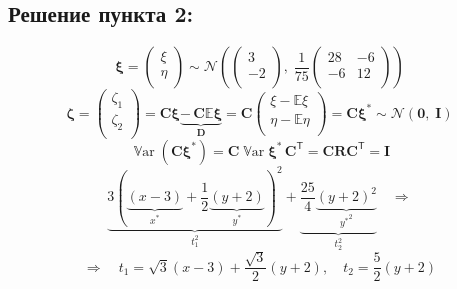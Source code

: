 \documentclass[12pt]{spbstu-task}
\begin{document}
\subsection*{Решение пункта 2:}
\begin{displaymath}
  \boldsymbol{\xi} = \begin{pmatrix}
    \xi \\
    \eta \\
  \end{pmatrix} \sim
  \mathcal{N}\left(\begin{pmatrix}
    3 \\
    -2 \\
  \end{pmatrix},\;\frac{1}{75}\begin{pmatrix}
    28 & -6 \\
    -6 & 12 \\
  \end{pmatrix}\right)
\end{displaymath}
\begin{displaymath}
  \boldsymbol{\zeta} = \begin{pmatrix}
    \zeta_1 \\
    \zeta_2 \\
  \end{pmatrix} = \mathbf{C}\boldsymbol{\xi}\underbrace{-\,\mathbf{C}\mathbb{E}\boldsymbol{\xi}}_{\mathbf{D}} = \mathbf{C}\begin{pmatrix}
    \xi - \mathbb{E}\xi \\
    \eta - \mathbb{E}\eta \\
  \end{pmatrix} = \mathbf{C}\boldsymbol{\xi}^* \sim \mathcal{N}\left(\mathbf{0},\;\mathbf{I}\right)
\end{displaymath}
\begin{displaymath}
  \operatorname{\mathbb{V}ar}(\mathbf{C}\boldsymbol{\xi}^*) =
  \mathbf{C}\operatorname{\mathbb{V}ar}\boldsymbol{\xi}^*\,\mathbf{C}^\mathsf{T} =
  \mathbf{C}\mathbf{R}\mathbf{C}^\mathsf{T} = \mathbf{I}
\end{displaymath}
\begin{displaymath}
  \underbrace{3\left(\underbrace{(x - 3)}_{x^*} + \frac{1}{2}\underbrace{(y + 2)}_{y^*}\right)^2}_{t_1^2} + \underbrace{\frac{25}{4}\underbrace{(y + 2)^2}_{{y^*}^2}}_{t_2^2}\quad\Rightarrow
\end{displaymath}
\begin{displaymath}
  \Rightarrow\quad t_1 = \sqrt{3}(x - 3) + \frac{\sqrt{3}}{2}(y + 2),\quad t_2 = \frac{5}{2}(y + 2)
\end{displaymath}
\end{document}
